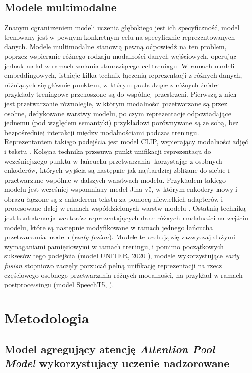 \subsection{Modele multimodalne}
Znanym ograniczeniem modeli uczenia głębokiego jest ich specyficzność, model trenowany jest w pewnym konkretnym celu na specyficznie reprezentowanych danych. Modele multimodalne stanowią pewną odpowiedź na ten problem, poprzez wspieranie różnego rodzaju modalności danych wejściowych, operując jednak nadal w ramach zadania stanowiącego cel treningu. W ramach modeli embeddingowych, istnieje kilka technik łączenią reprezentacji z różnych danych, różniących się głównie punktem, w którym pochodzące z różnych źródeł przykłady treningowe przenoszone są do wspólnej przestrzeni. Pierwszą z nich jest przetwarzanie równoległe, w którym modalności przetwarzane są przez osobne, dedykowane warstwy modelu, po czym reprezentacje odpowiadające jednemu (pod względem semantyki) przykładowi porównywane są ze sobą, bez bezpośredniej interakcji między modalnościami podczas treningu. Reprezentantem takiego podejścia jest model CLIP, wspierający modalności zdjęć i tekstu \cite{radford2021learning}. Kolejna technika przesuwa punkt unifikacji reprezentacji do wcześniejszego punktu w łańcuchu przetwarzania, korzystając z osobnych enkoderów, których wyjścia są następnie jak najbardziej zbliżane do siebie i przetwarzane wspólnie w dalszych warstwach modelu. Przykładem takiego modelu jest wcześniej wspomniany model Jina v5, w którym enkodery mowy i obrazu łączone są z enkoderem tekstu za pomocą niewielkich adapterów i procesowane dalej w ramach współdzielonych warstw modelu \cite{Jina5}. Ostatnią techniką jest konkatenacja wektorów reprezentujących dane różnych modalności na wejściu modelu, które są następnie modyfikowane w ramach jednego łańcucha przetwarzania modelu (\textit{early fusion}). Modele te cechują się zazwyczaj dużymi wymaganiami pamięciowymi w ramach treningu, i pomimo początkowych suksesów tego podejścia (model UNITER, 2020 \cite{chen2020uniter}), modele wykorzystujące \textit{early fusion} stopniowo zaczęły porzucać pełną unifikację reprezentacji na rzecz częściowego osobnego przetwarzania różnych modalności, na przykład w ramach postprocessingu (model SpeechT5, \cite{speecht5}).


\section{Metodologia}
\subsection{Model agregujący atencję \textit{Attention Pool Model} wykorzystujacy uczenie nadzorowane}

